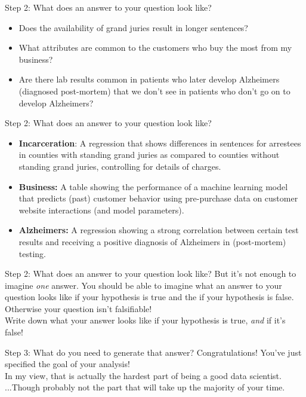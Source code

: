 \documentclass[11pt]{beamer}
\begin{document}
\begin{frame}[c]{Step 2: What does \alert{an answer} to your question look like?}
    \begin{itemize}
      \item Does the availability of grand juries result in longer sentences?
      \pause \item What attributes are common to the customers who buy the most from my business?
      \pause \item Are there lab results common in patients who later develop Alzheimers (diagnosed post-mortem) that we don't see in patients who don't go on to develop Alzheimers?
    \end{itemize}
\end{frame}

\begin{frame}[c]{Step 2: What does \alert{an answer} to your question look like?}
  \begin{itemize}
    \pause \item \textbf{Incarceration}: A regression that shows differences in sentences for arrestees in counties with standing grand juries as compared to counties without standing grand juries, controlling for details of charges.
    \pause \item \textbf{Business:} A table showing the performance of a machine learning model that predicts (past) customer behavior using pre-purchase data on customer website interactions (and model parameters).
    \pause \item \textbf{Alzheimers:} A regression showing a strong correlation between certain test results and receiving a positive diagnosis of Alzheimers in (post-mortem) testing.
  \end{itemize}
\end{frame}

\begin{frame}[c]{Step 2: What does \alert{an answer} to your question look like?}
But it's not enough to imagine \emph{one} answer. You should be able to imagine what an answer to your question looks like if your hypothesis \alert{is true} and the if your hypothesis \alert{is false}. \\
\pause Otherwise your question isn't falsifiable! \\
\vspace*{0.3cm}
Write down what your answer looks like if your hypothesis is true, \emph{and} if it's false!
\end{frame}

\begin{frame}[c]{Step 3: What do you need to generate that answer?}
  Congratulations! You've just specified the goal of your analysis! \\
  \pause In my view, that is actually the hardest part of being a good data scientist. \\
  \pause ...Though probably not the part that will take up the majority of your time.
\end{frame}
\end{document}

